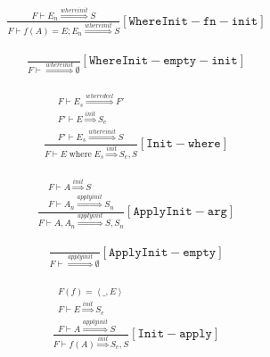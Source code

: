 \documentclass{scrartcl}
\DeclareMathOperator{\where}{where}
\begin{document}
    \begin{align*}
    \frac{
        F \vdash E_n \overset{whereinit}{\Rightarrow} S
    }{
        F \vdash f(A) = E; E_n \overset{whereinit}{\Rightarrow} S
    }[\mathtt{WhereInit-fn-init}]
    \end{align*}
    
    \begin{align*}
    \frac{}{
        F \vdash \overset{whereinit}{\Rightarrow} \emptyset
    }[\mathtt{WhereInit-empty-init}]
    \end{align*}
    
    \begin{align*}
    \frac{
        \begin{matrix}
        F \vdash E_s \overset{wheredecl}{\Rightarrow} F' \\
        F' \vdash E \overset{init}{\Rightarrow} S_e \\
        F' \vdash E_s \overset{whereinit}{\Rightarrow} S
        \end{matrix}
    }{
        F \vdash E \where E_s \overset{init}{\Rightarrow} S_e, S
    }[\mathtt{Init-where}]
    \end{align*}
    
    \begin{align*}
    \frac{
        \begin{matrix}
        F \vdash A \overset{init}{\Rightarrow} S \\
        F \vdash A_n \overset{applyinit}{\Rightarrow} S_n
        \end{matrix}
    }{
        F \vdash A, A_n \overset{applyinit}{\Rightarrow} S, S_n
    }[\mathtt{ApplyInit-arg}]
    \end{align*}
    
    \begin{align*}
    \frac{}{
        F \vdash \overset{applyinit}{\Rightarrow} \emptyset
    }[\mathtt{ApplyInit-empty}]
    \end{align*}
    
    \begin{align*}
    \frac{
        \begin{matrix}
        F(f) = \left< \_, E \right> \\
        F \vdash E \overset{init}{\Rightarrow} S_e \\
        F \vdash A \overset{applyinit}{\Rightarrow} S
        \end{matrix}
    }{
        F \vdash f(A) \overset{init}{\Rightarrow} S_e, S
    }[\mathtt{Init-apply}]
    \end{align*}
    
\end{document}
